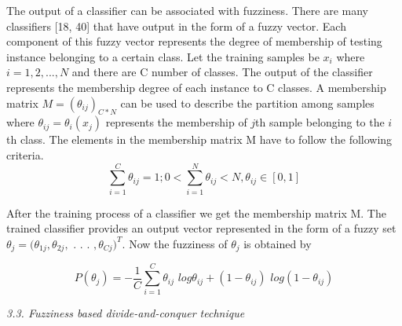 \documentclass{article}
\begin{document}
		The output of a classifier can be associated with fuzziness. There are many classifiers [18, 40] that have
		output in the form of a fuzzy vector. Each component of this fuzzy vector represents the degree of membership
		of testing instance belonging to a certain class. Let the training samples be $x_i$ where $i = 1, 2, . . . , N$ and
		there are C number of classes. The output of the classifier represents the membership degree of each instance
		to C classes. A membership matrix $M = (\theta_{ij})_{C*N}$ can be used to describe the partition among samples
		where $\theta_{ij} = \theta_i(x_j)$ represents the membership of $j$th sample belonging to the $i$th class. The elements in the
		membership matrix M have to follow the following criteria.
		\begin{equation} \label{$eq:(1)$}
		\sum_{i=1}^{C} \theta_{ij} = 1;0 < \sum_{i=1}^{N} \theta_{ij} < N,\theta_{ij} \in [0,1]
		\end{equation}
		
		After the training process of a classifier we get the membership matrix M. The trained classifier provides
		an output vector represented in the form of a fuzzy set $\theta_j = (\theta_{1j} , \theta_{2j} , $ . $  $.$ $ . $ , \theta_{Cj})^T$. Now the fuzziness of $\theta_j$ is obtained by
		
		\begin{equation} \label{$eq:(1)$}P(\theta_j) = -\frac {1}{C} \sum_{i=1}^{C} \theta_{ij}\,\, log\theta_{ij} + (1 - \theta_{ij}) \,\,log(1 - \theta_{ij}) \end{equation}
		
		
		\newpage
		\onehalfspacing
		\textit{3.3. Fuzziness based divide-and-conquer technique}\\
		
\end{document}
